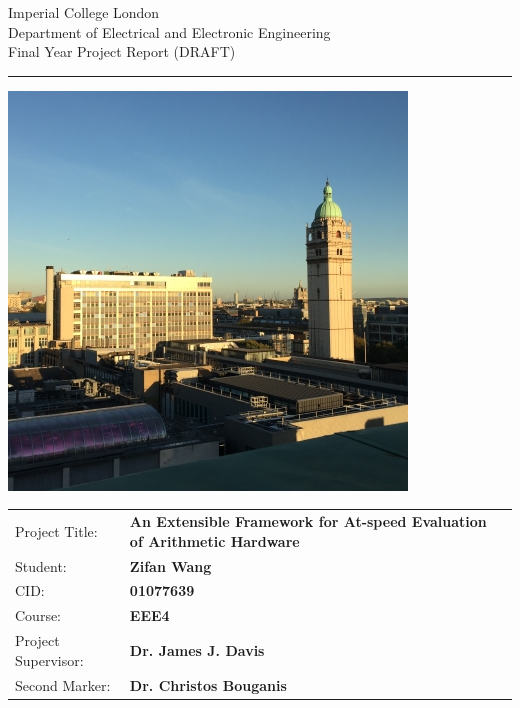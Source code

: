 \begin{titlepage}
  { \Large
    Imperial College London\\[17pt]
    Department of Electrical and Electronic Engineering\\[17pt]
    Final Year Project Report (DRAFT)
  }

  \rule{\columnwidth}{3pt}
  \vfill
  \centering
  \includegraphics[width=0.7\columnwidth]{img/1.jpg}
  \vfill

  \begin{table}[h]
  \def\arraystretch{1.8}
    \begin{tabular}{p{40mm}p{\dimexpr\columnwidth-40mm}}
      Project Title: & \textbf{An Extensible Framework for \newline At-speed Evaluation of Arithmetic Hardware} \\
      Student:       & \textbf{Zifan Wang} \\
      CID:           & \textbf{01077639} \\
      Course:        & \textbf{EEE4} \\
      Project Supervisor: & \textbf{Dr. James J. Davis} \\
      Second Marker: & \textbf{Dr. Christos Bouganis}
    \end{tabular}
  \end{table}
\end{titlepage}